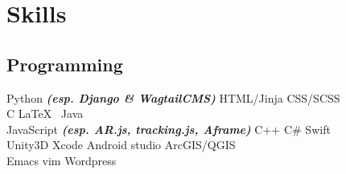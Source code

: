 \documentclass[a4paper]{deedy-resume} %
\begin{document}
\begin{minipage}[t]{0.33\textwidth}


\section{Skills}

\subsection{Programming}

Python {\footnotesize \textit{\textbf{(esp. Django \& WagtailCMS)}}} \textbullet{} HTML/Jinja \textbullet{} CSS/SCSS \\
C \textbullet{} \LaTeX\ \textbullet{} Java \\
JavaScript {\footnotesize \textit{\textbf{(esp. AR.js, tracking.js, Aframe)}}} \textbullet{} C++ \textbullet{} C# \textbullet{} Swift \\
Unity3D \textbullet{} Xcode \textbullet{} Android studio \textbullet{} ArcGIS/QGIS \\
Emacs \textbullet{} vim \textbullet{} Wordpress \\

\sectionspace %


\end{minipage} %
\hfill
%
%
\end{document}
